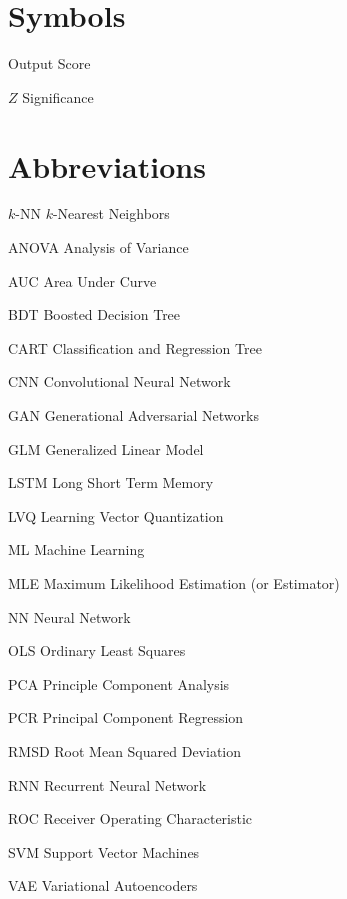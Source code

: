 \abbreviations

\section*{Symbols}

\begin{symbollist}
	\item[\yhat] Output Score
	\item[$Z$] Significance
\end{symbollist}

\section*{Abbreviations}

\begin{symbollist}
	\item[$k$-NN] $k$-Nearest Neighbors
	\item[ANOVA] Analysis of Variance
	\item[AUC] Area Under Curve
	\item[BDT] Boosted Decision Tree
	\item[CART] Classification and Regression Tree
	\item[CNN] Convolutional Neural Network
	\item[GAN] Generational Adversarial Networks
	\item[GLM] Generalized Linear Model
	\item[LSTM] Long Short Term Memory
	\item[LVQ] Learning Vector Quantization
	\item[ML] Machine Learning
	\item[MLE] Maximum Likelihood Estimation (or Estimator)
	\item[NN] Neural Network
	\item[OLS] Ordinary Least Squares
	\item[PCA] Principle Component Analysis
	\item[PCR] Principal Component Regression
	\item[RMSD] Root Mean Squared Deviation
	\item[RNN] Recurrent Neural Network
	\item[ROC] Receiver Operating Characteristic
	\item[SVM] Support Vector Machines
	\item[VAE] Variational Autoencoders
\end{symbollist}
